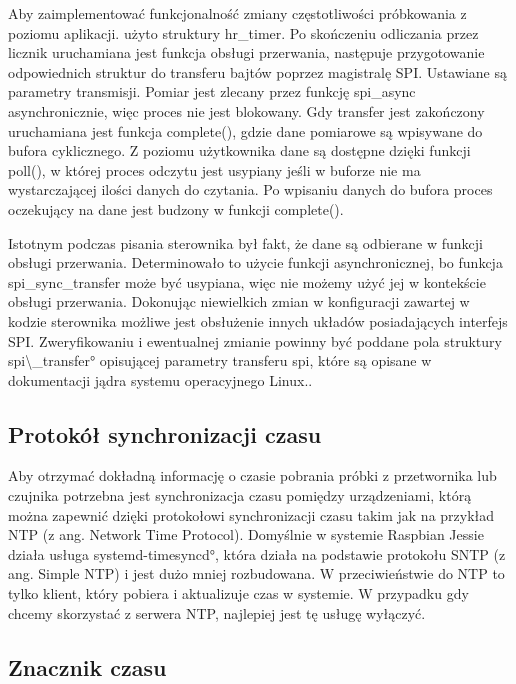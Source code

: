 Aby zaimplementować funkcjonalność zmiany częstotliwości próbkowania z poziomu aplikacji. 
użyto struktury hr\_timer. Po skończeniu odliczania przez licznik uruchamiana jest funkcja obsługi przerwania, następuje przygotowanie odpowiednich struktur do transferu bajtów poprzez magistralę SPI. Ustawiane są parametry transmisji. Pomiar jest zlecany przez funkcję spi\_async asynchronicznie, więc proces nie jest blokowany. Gdy transfer jest zakończony uruchamiana jest funkcja complete(), gdzie dane pomiarowe są wpisywane do bufora cyklicznego. Z poziomu użytkownika dane są dostępne dzięki funkcji poll(), w której proces odczytu jest usypiany jeśli w buforze nie ma wystarczającej ilości danych do czytania. Po wpisaniu danych do bufora proces oczekujący na dane jest budzony w funkcji complete().


Istotnym podczas pisania sterownika był fakt, że dane są odbierane w funkcji obsługi przerwania. Determinowało to użycie funkcji asynchronicznej, bo funkcja spi\_sync\_transfer może być usypiana, więc nie możemy użyć jej w kontekście obsługi przerwania.
Dokonując niewielkich zmian w konfiguracji zawartej w kodzie sterownika możliwe jest obsłużenie innych układów posiadających interfejs SPI. Zweryfikowaniu i ewentualnej zmianie powinny być poddane pola struktury \ang{spi\_transfer} opisującej parametry transferu spi, które są opisane w dokumentacji jądra systemu operacyjnego Linux.\cite{spiKernel}.

\subsection{Protokół synchronizacji czasu}

Aby otrzymać dokładną informację o czasie pobrania próbki z przetwornika lub czujnika potrzebna jest synchronizacja czasu pomiędzy urządzeniami, którą można zapewnić dzięki protokołowi synchronizacji czasu takim jak na przykład NTP (z ang. Network Time Protocol).
Domyślnie w systemie Raspbian Jessie działa usługa \ang{systemd-timesyncd}, która działa na podstawie protokołu SNTP (z ang. Simple NTP) i jest dużo mniej rozbudowana. W przeciwieństwie do NTP to tylko klient, który pobiera i aktualizuje czas w systemie. W przypadku gdy chcemy skorzystać z serwera NTP, najlepiej jest tę usługę wyłączyć\cite{ntp}.

\subsection{Znacznik czasu}

